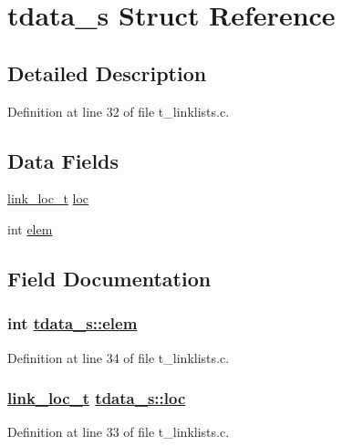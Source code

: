 \hypertarget{structtdata__s}{
\section{tdata\_\-s Struct Reference}
\label{structtdata__s}
}


\subsection{Detailed Description}




Definition at line 32 of file t\_\-linklists.c.\subsection*{Data Fields}
\begin{CompactItemize}
\item 
\hyperlink{group__dbprim__link_ga4}{link\_\-loc\_\-t} \hyperlink{structtdata__s_o0}{loc}
\item 
int \hyperlink{structtdata__s_o1}{elem}
\end{CompactItemize}


\subsection{Field Documentation}
\hypertarget{structtdata__s_o1}{
\subsubsection[elem]{\setlength{\rightskip}{0pt plus 5cm}int \hyperlink{structtdata__s_o1}{tdata\_\-s::elem}}}
\label{structtdata__s_o1}




Definition at line 34 of file t\_\-linklists.c.\hypertarget{structtdata__s_o0}{
\subsubsection[loc]{\setlength{\rightskip}{0pt plus 5cm}\hyperlink{group__dbprim__link_ga4}{link\_\-loc\_\-t} \hyperlink{structtdata__s_o0}{tdata\_\-s::loc}}}
\label{structtdata__s_o0}




Definition at line 33 of file t\_\-linklists.c.